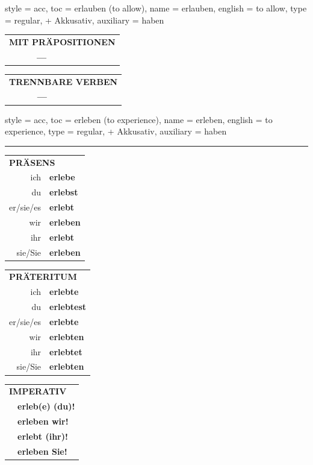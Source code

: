 \begin{verbentry}{
  style = {acc},
  toc = {erlauben (to allow)},
  name = {erlauben},
  english = {to allow},
  type = {regular, + Akkusativ},
  auxiliary = {haben}
}
  \vspace{10pt}

\begin{tabular}{lll}
\multicolumn{3}{l}{\textbf{MIT PRÄPOSITIONEN}}\\
& \textbf{---} & \\
\end{tabular}
\hfill
\begin{tabular}{lll}
\multicolumn{3}{l}{\textbf{TRENNBARE VERBEN}}\\
& \textbf{---} & \\
\end{tabular}

  \vspace{-5pt}
\end{verbentry}

\begin{verbentry}{
  style = {acc},
  toc = {erleben (to experience)},
  name = {erleben},
  english = {to experience},
  type = {regular, + Akkusativ},
  auxiliary = {haben}
}


\vspace{5pt}
\hrule
\vspace{5pt}

\begin{tabular}{rl}
\multicolumn{2}{l}{\textbf{PRÄSENS}}\\
ich & \textbf{erlebe}\\
du & \textbf{erlebst}\\
er/sie/es & \textbf{erlebt}\\
wir & \textbf{erleben}\\
ihr & \textbf{erlebt}\\
sie/Sie & \textbf{erleben}\\
\end{tabular}
\hfill
\begin{tabular}{rl}
\multicolumn{2}{l}{\textbf{PRÄTERITUM}}\\
ich & \textbf{erlebte}\\
du & \textbf{erlebtest}\\
er/sie/es & \textbf{erlebte}\\
wir & \textbf{erlebten}\\
ihr & \textbf{erlebtet}\\
sie/Sie & \textbf{erlebten}\\
\end{tabular}
\hfill
\begin{tabular}{rl}
\multicolumn{2}{l}{\textbf{IMPERATIV}}\\
& \textbf{erleb(e) (du)!}\\
& \textbf{erleben wir!}\\
& \textbf{erlebt (ihr)!}\\
& \textbf{erleben Sie!}\\
\end{tabular}


\end{verbentry}
